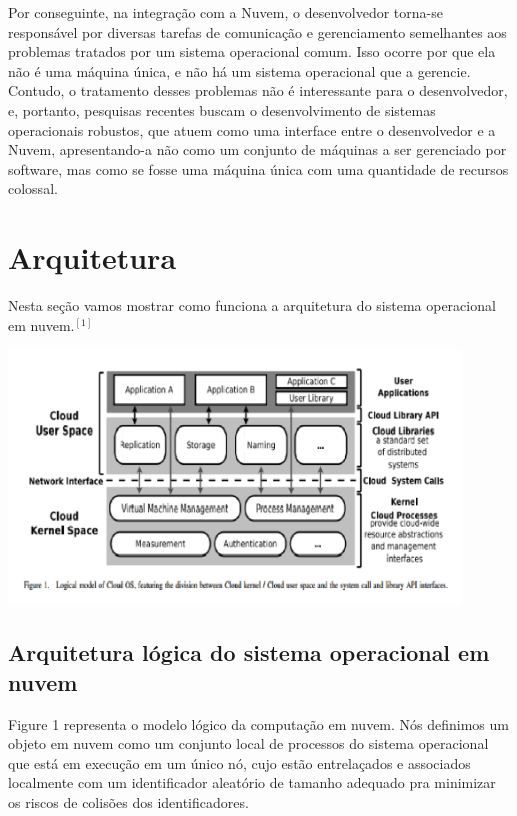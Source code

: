 \documentclass{llncs}
\begin{document}
Por conseguinte, na integração com a Nuvem, o desenvolvedor torna-se responsável por diversas tarefas de comunicação e gerenciamento semelhantes aos problemas tratados por um sistema operacional comum. Isso ocorre por que ela não é uma máquina única, e não há um sistema operacional que a gerencie. Contudo, o tratamento desses problemas não é interessante para o desenvolvedor, e, portanto, pesquisas recentes buscam o desenvolvimento de sistemas operacionais robustos, que atuem como uma interface entre o desenvolvedor e a Nuvem, apresentando-a não como um conjunto de máquinas a ser gerenciado por software, mas como se fosse uma máquina única com uma quantidade de recursos colossal.

\section{Arquitetura}
Nesta seção vamos mostrar como funciona a arquitetura do sistema operacional em nuvem.$^{[1]}$

\begin{center}
\includegraphics[width=12cm]{arq.png}
\end{center}

\subsection{Arquitetura lógica do sistema operacional em nuvem}
Figure 1 representa o modelo lógico da computação em nuvem. Nós definimos um objeto em nuvem como um conjunto local de processos do sistema operacional que está em execução em um único nó, cujo estão entrelaçados e associados localmente com um identificador aleatório de tamanho adequado pra minimizar os riscos de colisões dos identificadores.
\end{document}
